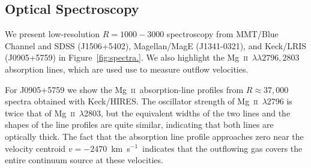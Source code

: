 \documentclass[apj]{emulateapj}
\newcommand{\kms}{km~s$^{-1}$}
\newcommand{\mgii}{\textrm{Mg}~\textsc{ii}}
\begin{document}
\subsection{Optical Spectroscopy}

We present low-resolution $R=1000-3000$ spectroscopy from MMT/Blue
Channel and SDSS (J1506+5402), Magellan/MagE (J1341-0321), and
Keck/LRIS (J0905+5759) in Figure~\ref{fig:spectra.}.  We also
highlight the \mgii~$\lambda\lambda2796,2803$ absorption lines, which
are used use to measure outflow velocities.

For J0905+5759 we show the \mgii\ absorption-line profiles from
$R\approx37,000$ spectra obtained with Keck/HIRES.  The oscillator
strength of \mgii~$\lambda$2796 is twice that of \mgii~$\lambda$2803,
but the equivalent widths of the two lines and the shapes of the line
profiles are quite similar, indicating that both lines are optically
thick.  The fact that the absorption line profile approaches zero near
the velocity centroid $v=-2470$~\kms\ indicates that the outflowing
gas covers the entire continuum source at these velocities.


%
%
%




\end{document}
